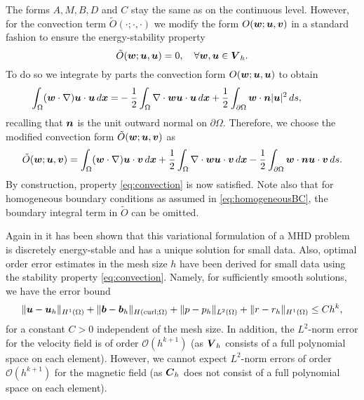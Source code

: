 The forms $A, M, B, D$ and $C$ stay the same as on the continuous level. However, for the convection term $\tilde{O}(\cdot;\cdot,\cdot)$ we modify the form $O(\boldsymbol w;\boldsymbol u,\boldsymbol v)$ in a standard fashion to ensure the energy-stability property
\begin{equation} \label{eq:convection}
    \tilde{O}(\boldsymbol w;\boldsymbol u,\boldsymbol u) = 0, \quad \forall \boldsymbol w,\boldsymbol u \in  \boldsymbol V_h.
\end{equation}
To do so we integrate by parts the convection form $O(\boldsymbol w;\boldsymbol u,\boldsymbol u)$  to obtain
\begin{equation} \nonumber
 \left. \begin{aligned}
     \int_\Omega (\boldsymbol w\cdot\nabla)\boldsymbol u \cdot\boldsymbol u \, d\boldsymbol x =& -\frac{1}{2}\int_{\Omega} \nabla \cdot \boldsymbol w \boldsymbol u \cdot \boldsymbol u \, d\boldsymbol x
     +\frac{1}{2}\int_{\partial \Omega} \boldsymbol w\cdot \boldsymbol n |\boldsymbol u|^2\, ds,
 \end{aligned}
 \right.
 \qquad \text{}
\end{equation}
recalling that $\boldsymbol n$ is the unit outward normal on $\partial \Omega$. Therefore, we choose the modified convection form $\tilde{O}(\boldsymbol w;\boldsymbol u,\boldsymbol v)$ as
$$\tilde{O}(\boldsymbol w;\boldsymbol u,\boldsymbol v) =  \int_\Omega (\boldsymbol w\cdot\nabla)\boldsymbol u \cdot\boldsymbol v \, d\boldsymbol x +\frac{1}{2}\int_{\Omega} \nabla \cdot \boldsymbol w \boldsymbol u \cdot \boldsymbol v\, d\boldsymbol x-\frac{1}{2}\int_{\partial \Omega} \boldsymbol w\cdot \boldsymbol n \boldsymbol u \cdot \boldsymbol v\, ds.$$
By construction, property \eqref{eq:convection} is now satisfied. Note also that for homogeneous boundary conditions as assumed in \eqref{eq:homogeneousBC}, the boundary integral term in $\tilde{O}$ can be omitted.

Again in \cite{schotzau2004mixed} it has been shown that this variational formulation of a MHD problem is discretely energy-stable and has a unique solution for small data. Also, optimal order error estimates in the mesh size $h$ have been derived for small data using the stability property \eqref{eq:convection}. Namely, for sufficiently smooth solutions, we have the error bound
$$\|\boldsymbol u-\boldsymbol u_h\|_{H^1(\Omega)}+\|\boldsymbol b-\boldsymbol b_h\|_{H(\rm{curl};\Omega)}+\|p-p_h\|_{L^2(\Omega)}+\|r-r_h\|_{H^1(\Omega)} \leq C h^k,$$
for a constant $C>0$ independent of the mesh size. In addition, the $L^2$-norm error for the velocity field is of order $\mathcal{O}(h^{k+1})$ (as $\boldsymbol V_h$ consists of a full polynomial space on each element). However, we cannot expect $L^2$-norm errors of  order $\mathcal{O}(h^{k+1})$ for the magnetic field (as $\boldsymbol C_h$ does not consist of a full polynomial space on each element).


